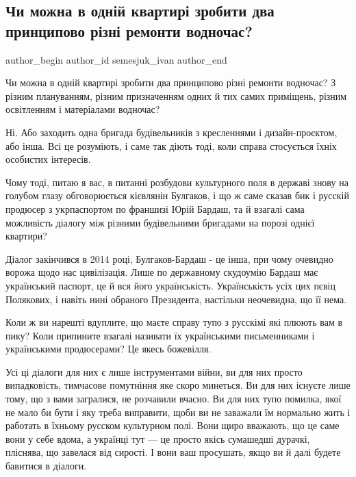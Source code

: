  
 
 
 
 
 
\subsection{Чи можна в одній квартирі зробити два принципово різні ремонти водночас?}
\label{sec:20_11_2020.fb.semesjuk_ivan.1.kvartira_dva_remonty}
\ifcmt
	author_begin
   author_id semesjuk_ivan
	author_end
\fi

Чи можна в одній квартирі зробити два принципово різні ремонти водночас? З
різним плануванням, різним призначенням одних й тих самих приміщень, різним
освітленням і матеріалами водночас?

Ні. Або заходить одна бригада будівельників з кресленнями і дизайн-проєктом,
або інша. Всі це розуміють, і саме так діють тоді, коли справа стосується їхніх
особистих інтересів. 

Чому тоді, питаю я вас, в питанні розбудови культурного поля в державі знову на
голубом глазу обговорюється кієвлянін Булгаков, і що ж саме сказав бик і
русскій продюсер з укрпаспортом по франшизі Юрій Бардаш, та й взагалі сама
можливість діалогу між різними будівельними бригадами на порозі однієї
квартири?

Діалог закінчився в 2014 році, Булгаков-Бардаш - це інша, при чому очевидно
ворожа щодо нас цивілізація. Лише по державному скудоумію Бардаш має
український паспорт, це й вся його українськість. Українськість усіх цих пєвіц
Полякових, і навіть нині обраного Президента, настільки неочевидна, що її нема.

Коли ж ви нарешті вдуплите, що маєте справу тупо з русскімі які плюють вам в
пику? Коли припините взагалі називати їх українськими письменниками і
українськими продюсерами? Це якесь божевілля.

Усі ці діалоги для них є лише інструментами війни, ви для них просто
випадковість, тимчасове помутніння яке скоро минеться. Ви для них існуєте лише
тому, що з вами загралися, не розчавили вчасно. Ви для них тупо помилка, якої
не мало би бути і яку треба виправити, щоби ви не заважали їм нормально жить і
работать в їхньому русском культурном полі. Вони щиро вважають, що це саме вони
у себе вдома, а українці тут --- це просто якісь сумашедші дурачкі, пліснява, що
завелася від сирості. І вони ваш просушать, якщо ви й далі будете бавитися в
діалоги.

